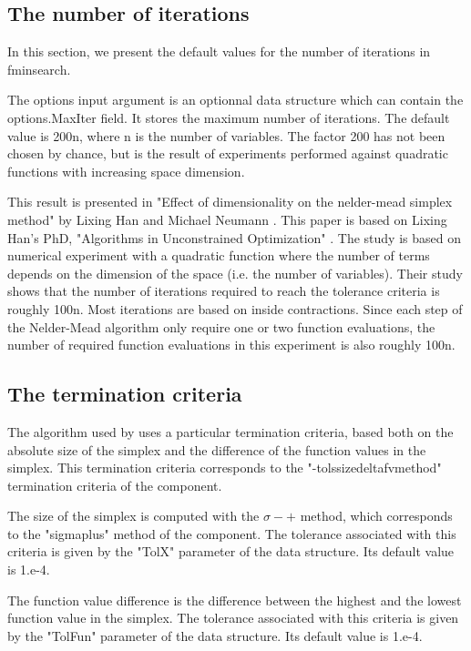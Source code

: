 \subsection{The number of iterations}

In this section, we present the default values for the number of 
iterations in fminsearch.

The options input argument is an optionnal data structure which can 
contain the options.MaxIter field. It stores the maximum number of 
iterations. The default value is 200n, where n is the number of 
variables. The factor 200 has not been chosen by chance, but is the 
result of experiments performed against quadratic functions with 
increasing space dimension.

This result is presented in "Effect of dimensionality on the nelder-mead 
simplex method" by Lixing Han and Michael Neumann \cite{HanNeumann2006}. This paper is based 
on Lixing Han's PhD, "Algorithms in Unconstrained Optimization" \cite{Han2000}. The 
study is based on numerical experiment with a quadratic function where 
the number of terms depends on the dimension of the space (i.e. the 
number of variables). Their study shows that the number of iterations 
required to reach the tolerance criteria is roughly 100n. Most 
iterations are based on inside contractions. Since each step of the 
Nelder-Mead algorithm only require one or two function evaluations, the 
number of required function evaluations in this experiment is also 
roughly 100n.

\subsection{The termination criteria}

The algorithm used by  uses a particular 
termination criteria, based both on the absolute size of the 
simplex and the difference of the function values in the simplex.
This termination criteria corresponds to the "-tolssizedeltafvmethod"
termination criteria of the  component.

The size of the simplex is computed with the $\sigma-+$ method,
which corresponds to the "sigmaplus" method of the 
component. The tolerance associated with this criteria is 
given by the "TolX" parameter of the  data structure.
Its default value is 1.e-4.

The function value difference is the difference 
between the highest and the lowest function value in the simplex.
The tolerance associated with this criteria is given by the 
"TolFun" parameter of the  data structure.
Its default value is 1.e-4.

